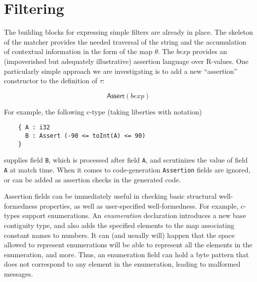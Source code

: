 \documentclass[svgnames]{llncs}
\newcommand{\konst}[1]{\ensuremath{\mathsf{#1}}}
\begin{document}
\section{Filtering}

The building blocks for expressing simple filters are already in
place. The skeleton of the matcher provides the needed traversal of
the string and the accumulation of contextual information in the form
of the map $\theta$. The $\mathit{bexp}$ provides an (impoverished but
adequately illustrative) assertion language over R-values. One
particularly simple approach we are investigating is to add a new
``assertion'' constructor to the definition of $\tau$:

\[
  \konst{Assert}(\mathit{bexp})
\]

\noindent For example, the following c-type (taking liberties with notation)

\begin{verbatim}
    { A : i32
      B : Assert (-90 <= toInt(A) <= 90)
    }
\end{verbatim}

\noindent supplies field \verb+B+, which is processed after field
\verb+A+, and scrutinizes the value of field \verb+A+ at
match time. When it comes to code-generation \verb+Assertion+ fields
are ignored, or can be added as assertion checks in the generated code.

Assertion fields can be immediately useful in checking basic
structural well-formedness properties, as well as user-specified
well-formedness. For example, c-types support enumerations. An
\emph{enumeration} declaration introduces a new base contiguity type,
and also adds the specified elements to the map associating constant
names to numbers. It can (and usually will) happen that the space
allowed to represent enumerations will be able to represent all the
elements in the enumeration, and more. Thus, an enumeration field can
hold a byte pattern that does not correspond to any element in the
enumeration, leading to malformed messages.
\end{document}
